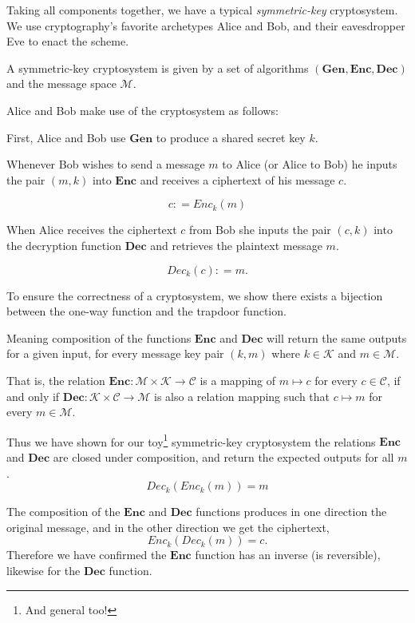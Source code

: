 \bigskip



\medskip

Taking all components together, we have a typical \emph{symmetric-key} cryptosystem. We use cryptography's favorite archetypes Alice and Bob, and their eavesdropper Eve to enact the scheme.


\medskip

A symmetric-key cryptosystem is given by a set of algorithms $\mathbf{(Gen, Enc, Dec)}$ and the message space $\mathcal{M}$.


Alice and Bob make use of the cryptosystem as follows: 

First, Alice and Bob use $\mathbf{Gen}$ to produce a shared secret key $k$.

Whenever Bob wishes to send a message $m$ to Alice (or Alice to Bob) he inputs the pair $(m,k)$ into $\mathbf{Enc}$ and receives a ciphertext of his message $c$.

\[c \mathrel{\mathop:}= Enc_{k}(m)\]

When Alice receives the ciphertext $c$ from Bob she inputs the pair $(c,k)$ into the decryption function $\mathbf{Dec}$ and retrieves the plaintext message $m$.

\[Dec_{k}(c) \mathrel{\mathop:}= m.\]



To ensure the correctness of a cryptosystem, we show there exists a bijection between the one-way function and the trapdoor function.

Meaning composition of the functions $\mathbf{Enc}$ and $\mathbf{Dec}$ will return the same outputs for a given input, for every message key pair $(k,m)$ where $k \in \mathcal{K}$ and $m \in \mathcal{M}$.

\smallskip

That is, the relation $\mathbf{Enc} : \mathcal{M} \times \mathcal{K} \rightarrow \mathcal{C}$ is a mapping of $m \mapsto c$ for every $c \in \mathcal{C}$, 
if and only if $\mathbf{Dec}: \mathcal{K} \times \mathcal{C} \rightarrow \mathcal{M}$ is also a relation mapping such that $c \mapsto m$ for every $m \in \mathcal{M}$. 

Thus we have shown for our toy\footnote{And general too!} symmetric-key cryptosystem the relations $\mathbf{Enc}$ and $\mathbf{Dec}$ are closed under composition, and return the expected outputs for all $m$.
\[Dec_{k}(Enc_{k}(m)) = m\]


The composition of the $\mathbf{Enc}$ and $\mathbf{Dec}$ functions produces in one direction the original message, and in the other direction we get the ciphertext,
\[Enc_{k}(Dec_{k}(m)) = c.\]
Therefore we have confirmed the $\mathbf{Enc}$ function has an inverse (is reversible), likewise for the $\mathbf{Dec}$ function. 




